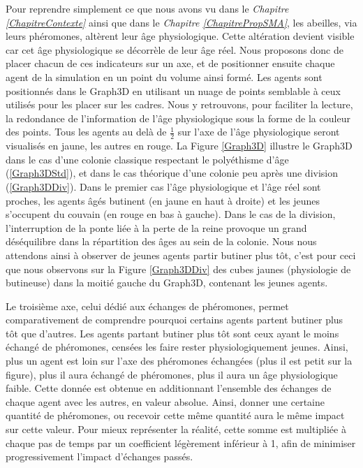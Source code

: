 		Pour reprendre simplement ce que nous avons vu dans le \textit{Chapitre \ref{ChapitreContexte}} ainsi que dans le \textit{Chapitre \ref{ChapitrePropSMA}}, les abeilles, via leurs phéromones, altèrent leur âge physiologique. Cette altération devient visible car cet âge physiologique se décorrèle de leur âge réel. Nous proposons donc de placer chacun de ces indicateurs sur un axe, et de positionner ensuite chaque agent de la simulation en un point du volume ainsi formé. Les agents sont positionnés dans le Graph3D en utilisant un nuage de points semblable à ceux utilisés pour les placer sur les cadres. Nous y retrouvons, pour faciliter la lecture, la redondance de l'information de l'âge physiologique sous la forme de la couleur des points. Tous les agents au delà de $\frac{1}{2}$ sur l'axe de l'âge physiologique seront visualisés en jaune, les autres en rouge.
		La Figure \ref{Graph3D} illustre le Graph3D dans le cas d'une colonie classique respectant le polyéthisme d'âge (\ref{Graph3DStd}), et dans le cas théorique d'une colonie peu après une division (\ref{Graph3DDiv}). Dans le premier cas l'âge physiologique et l'âge réel sont proches, les agents âgés butinent (en jaune en haut à droite) et les jeunes s'occupent du couvain (en rouge en bas à gauche). Dans le cas de la division, l'interruption de la ponte liée à la perte de la reine provoque un grand déséquilibre dans la répartition des âges au sein de la colonie. Nous nous attendons ainsi à observer de jeunes agents partir butiner plus tôt, c'est pour ceci que nous observons sur la Figure \ref{Graph3DDiv} des cubes jaunes (physiologie de butineuse) dans la moitié gauche du Graph3D, contenant les jeunes agents.
		
		Le troisième axe, celui dédié aux échanges de phéromones, permet comparativement de comprendre pourquoi certains agents partent butiner plus tôt que d'autres. Les agents partant butiner plus tôt sont ceux ayant le moins échangé de phéromones, censées les faire rester physiologiquement jeunes. Ainsi, plus un agent est loin sur l'axe des phéromones échangées (plus il est petit sur la figure), plus il aura échangé de phéromones, plus il aura un âge physiologique faible. Cette donnée est obtenue en additionnant l'ensemble des échanges de chaque agent avec les autres, en valeur absolue. Ainsi, donner une certaine quantité de phéromones, ou recevoir cette même quantité aura le même impact sur cette valeur. Pour mieux représenter la réalité, cette somme est multipliée à chaque pas de temps par un coefficient légèrement inférieur à 1, afin de minimiser progressivement l'impact d'échanges passés.
		
